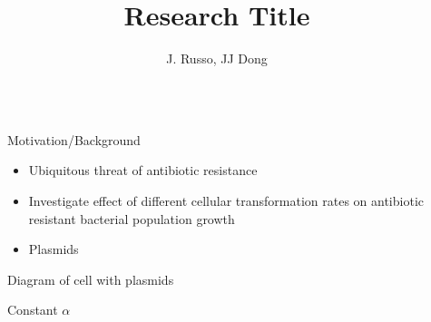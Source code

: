 \documentclass[final]{beamer}
\title{Research Title} %
\author{J. Russo, JJ Dong} %
\institute{Bucknell University, Department of Physics and Astronomy} %
\newlength{\sepwid}
\newlength{\onecolwid}
\begin{document}

\setlength{\belowcaptionskip}{2ex} %
\setlength\belowdisplayshortskip{2ex} %

\begin{frame}[t] %
\begin{columns}[t] %

\begin{column}{\sepwid}\end{column} %


\begin{column}{\onecolwid}


  \begin{alertblock}{Motivation/Background}

  \begin{itemize}
    \item Ubiquitous threat of antibiotic resistance
    \item Investigate effect of different cellular transformation rates on antibiotic
    resistant bacterial population growth
    \item Plasmids
  \end{itemize}

  \begin{center}
    Diagram of cell with plasmids
  \end{center}

  \end{alertblock}



  \begin{alertblock}{Constant $\alpha$}


\end{alertblock}
\end{column}
\end{columns}
\end{frame}
\end{document}
